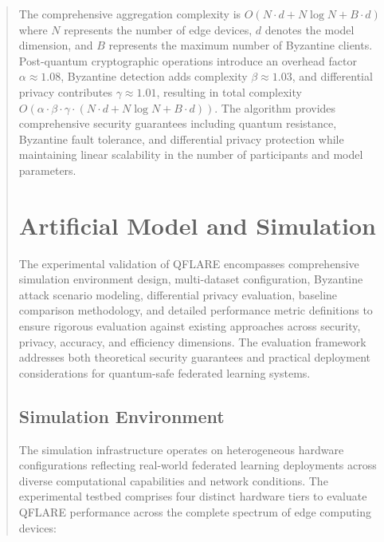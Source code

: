 \documentclass{svproc}
\begin{document}
\begin{abstract}
The comprehensive aggregation complexity is $O(N \cdot d + N \log N + B \cdot d)$ where $N$ represents the number of edge devices, $d$ denotes the model dimension, and $B$ represents the maximum number of Byzantine clients. Post-quantum cryptographic operations introduce an overhead factor $\alpha \approx 1.08$, Byzantine detection adds complexity $\beta \approx 1.03$, and differential privacy contributes $\gamma \approx 1.01$, resulting in total complexity $O(\alpha \cdot \beta \cdot \gamma \cdot (N \cdot d + N \log N + B \cdot d))$. The algorithm provides comprehensive security guarantees including quantum resistance, Byzantine fault tolerance, and differential privacy protection while maintaining linear scalability in the number of participants and model parameters.

\section{Artificial Model and Simulation}
\label{sec:simulation}

The experimental validation of QFLARE encompasses comprehensive simulation environment design, multi-dataset configuration, Byzantine attack scenario modeling, differential privacy evaluation, baseline comparison methodology, and detailed performance metric definitions to ensure rigorous evaluation against existing approaches across security, privacy, accuracy, and efficiency dimensions. The evaluation framework addresses both theoretical security guarantees and practical deployment considerations for quantum-safe federated learning systems.

\subsection{Simulation Environment}

The simulation infrastructure operates on heterogeneous hardware configurations reflecting real-world federated learning deployments across diverse computational capabilities and network conditions. The experimental testbed comprises four distinct hardware tiers to evaluate QFLARE performance across the complete spectrum of edge computing devices:


\end{abstract}
\end{document}
